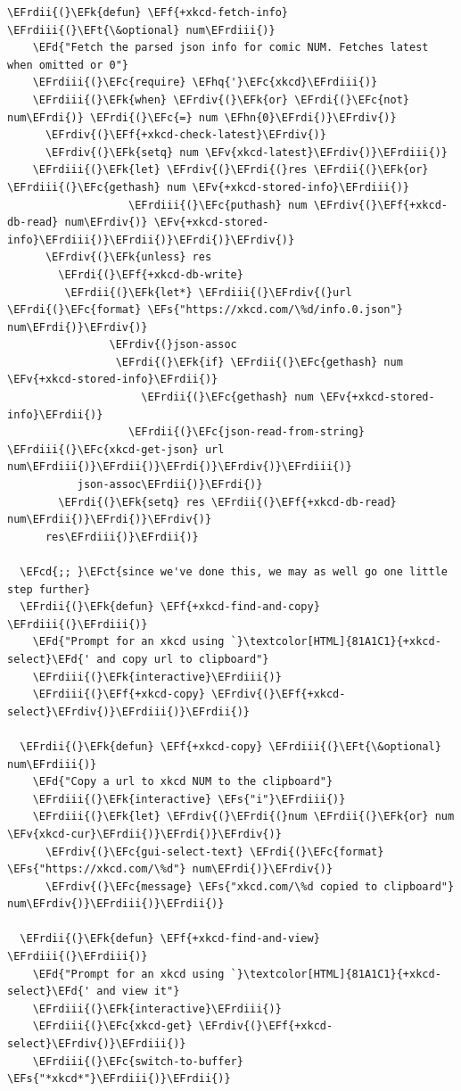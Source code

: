 \documentclass{scrartcl}
\newcommand{\EFk}[1]{\textcolor{EFk}{#1}} %
\newcommand{\EFd}[1]{\textcolor{EFd}{#1}} %
\newcommand{\EFt}[1]{\textcolor{EFt}{#1}} %
\newcommand{\EFs}[1]{\textcolor{EFs}{#1}} %
\newcommand{\EFct}[1]{\textcolor{EFct}{#1}} %
\newcommand{\EFc}[1]{\textcolor{EFc}{#1}} %
\newcommand{\EFv}[1]{\textcolor{EFv}{#1}} %
\newcommand{\EFf}[1]{\textcolor{EFf}{#1}} %
\newcommand{\EFcd}[1]{\textcolor{EFcd}{#1}} %
\newcommand{\EFhn}[1]{#1} %
\newcommand{\EFhq}[1]{#1} %
\newcommand{\EFrdi}[1]{#1} %
\newcommand{\EFrdii}[1]{#1} %
\newcommand{\EFrdiii}[1]{#1} %
\newcommand{\EFrdiv}[1]{#1} %
\begin{document}
\begin{Code}
\begin{Verbatim}[]
  \EFrdii{(}\EFk{defun} \EFf{+xkcd-fetch-info} \EFrdiii{(}\EFt{\&optional} num\EFrdiii{)}
    \EFd{"Fetch the parsed json info for comic NUM. Fetches latest when omitted or 0"}
    \EFrdiii{(}\EFc{require} \EFhq{'}\EFc{xkcd}\EFrdiii{)}
    \EFrdiii{(}\EFk{when} \EFrdiv{(}\EFk{or} \EFrdi{(}\EFc{not} num\EFrdi{)} \EFrdi{(}\EFc{=} num \EFhn{0}\EFrdi{)}\EFrdiv{)}
      \EFrdiv{(}\EFf{+xkcd-check-latest}\EFrdiv{)}
      \EFrdiv{(}\EFk{setq} num \EFv{xkcd-latest}\EFrdiv{)}\EFrdiii{)}
    \EFrdiii{(}\EFk{let} \EFrdiv{(}\EFrdi{(}res \EFrdii{(}\EFk{or} \EFrdiii{(}\EFc{gethash} num \EFv{+xkcd-stored-info}\EFrdiii{)}
                   \EFrdiii{(}\EFc{puthash} num \EFrdiv{(}\EFf{+xkcd-db-read} num\EFrdiv{)} \EFv{+xkcd-stored-info}\EFrdiii{)}\EFrdii{)}\EFrdi{)}\EFrdiv{)}
      \EFrdiv{(}\EFk{unless} res
        \EFrdi{(}\EFf{+xkcd-db-write}
         \EFrdii{(}\EFk{let*} \EFrdiii{(}\EFrdiv{(}url \EFrdi{(}\EFc{format} \EFs{"https://xkcd.com/\%d/info.0.json"} num\EFrdi{)}\EFrdiv{)}
                \EFrdiv{(}json-assoc
                 \EFrdi{(}\EFk{if} \EFrdii{(}\EFc{gethash} num \EFv{+xkcd-stored-info}\EFrdii{)}
                     \EFrdii{(}\EFc{gethash} num \EFv{+xkcd-stored-info}\EFrdii{)}
                   \EFrdii{(}\EFc{json-read-from-string} \EFrdiii{(}\EFc{xkcd-get-json} url num\EFrdiii{)}\EFrdii{)}\EFrdi{)}\EFrdiv{)}\EFrdiii{)}
           json-assoc\EFrdii{)}\EFrdi{)}
        \EFrdi{(}\EFk{setq} res \EFrdii{(}\EFf{+xkcd-db-read} num\EFrdii{)}\EFrdi{)}\EFrdiv{)}
      res\EFrdiii{)}\EFrdii{)}

  \EFcd{;; }\EFct{since we've done this, we may as well go one little step further}
  \EFrdii{(}\EFk{defun} \EFf{+xkcd-find-and-copy} \EFrdiii{(}\EFrdiii{)}
    \EFd{"Prompt for an xkcd using `}\textcolor[HTML]{81A1C1}{+xkcd-select}\EFd{' and copy url to clipboard"}
    \EFrdiii{(}\EFk{interactive}\EFrdiii{)}
    \EFrdiii{(}\EFf{+xkcd-copy} \EFrdiv{(}\EFf{+xkcd-select}\EFrdiv{)}\EFrdiii{)}\EFrdii{)}

  \EFrdii{(}\EFk{defun} \EFf{+xkcd-copy} \EFrdiii{(}\EFt{\&optional} num\EFrdiii{)}
    \EFd{"Copy a url to xkcd NUM to the clipboard"}
    \EFrdiii{(}\EFk{interactive} \EFs{"i"}\EFrdiii{)}
    \EFrdiii{(}\EFk{let} \EFrdiv{(}\EFrdi{(}num \EFrdii{(}\EFk{or} num \EFv{xkcd-cur}\EFrdii{)}\EFrdi{)}\EFrdiv{)}
      \EFrdiv{(}\EFc{gui-select-text} \EFrdi{(}\EFc{format} \EFs{"https://xkcd.com/\%d"} num\EFrdi{)}\EFrdiv{)}
      \EFrdiv{(}\EFc{message} \EFs{"xkcd.com/\%d copied to clipboard"} num\EFrdiv{)}\EFrdiii{)}\EFrdii{)}

  \EFrdii{(}\EFk{defun} \EFf{+xkcd-find-and-view} \EFrdiii{(}\EFrdiii{)}
    \EFd{"Prompt for an xkcd using `}\textcolor[HTML]{81A1C1}{+xkcd-select}\EFd{' and view it"}
    \EFrdiii{(}\EFk{interactive}\EFrdiii{)}
    \EFrdiii{(}\EFc{xkcd-get} \EFrdiv{(}\EFf{+xkcd-select}\EFrdiv{)}\EFrdiii{)}
    \EFrdiii{(}\EFc{switch-to-buffer} \EFs{"*xkcd*"}\EFrdiii{)}\EFrdii{)}


\end{Verbatim}
\end{Code}
\end{document}
